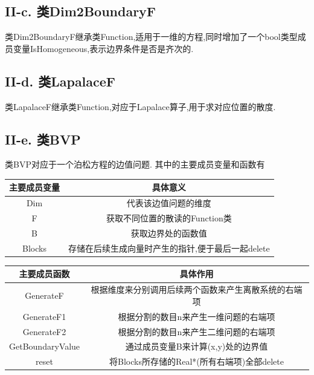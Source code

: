 \documentclass[twoside,a4paper]{article}
\begin{document}
\subsection*{II-c. 类Dim2BoundaryF}
类Dim2BoundaryF继承类Function,适用于一维的方程,同时增加了一个bool类型成员变量IsHomogeneous,表示边界条件是否是齐次的.

\subsection*{II-d. 类LapalaceF}
类LapalaceF继承类Function,对应于Lapalace算子,用于求对应位置的散度.

\newpage
\subsection*{II-e. 类BVP}
类BVP对应于一个泊松方程的边值问题.
其中的主要成员变量和函数有
\begin{center}
    \begin{tabular}{c|c}
        主要成员变量 & 具体意义                                          \\
        \hline
        Dim          & 代表该边值问题的维度                              \\
        F            & 获取不同位置的散读的Function类                    \\
        B            & 获取边界处的函数值                                \\
        Blocks       & 存储在后续生成向量时产生的指针,便于最后一起delete \\
    \end{tabular}
\end{center}

\begin{center}
    \begin{tabular}{c|c}
        主要成员函数     & 具体作用                                             \\
        \hline
        GenerateF        & 根据维度来分别调用后续两个函数来产生离散系统的右端项 \\
        GenerateF1       & 根据分割的数目n来产生一维问题的右端项                \\
        GenerateF2       & 根据分割的数目n来产生二维问题的右端项                \\
        GetBoundaryValue & 通过成员变量B来计算(x,y)处的边界值                   \\
        reset            & 将Blocks所存储的Real*(所有右端项)全部delete          \\
    \end{tabular}
\end{center}
\end{document}
